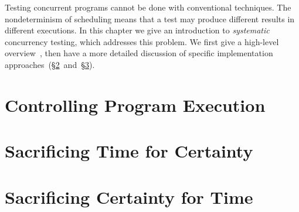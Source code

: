 \chapstart Testing concurrent programs cannot be done with conventional
techniques.  The nondeterminism of scheduling means that a test may produce
different results in different executions.  In this chapter we give an
introduction to \emph{systematic} concurrency testing, which addresses this
problem.  We first give a high-level overview~, then have
a more detailed discussion of specific implementation
approaches~(\S\ref{sec:sct-complete}~and~\S\ref{sec:sct-incomplete}).

\section{Controlling Program Execution}
\label{sec:sct-fundamentals}
\blindtext

\section{Sacrificing Time for Certainty}
\label{sec:sct-complete}
\blindtext

\section{Sacrificing Certainty for Time}
\label{sec:sct-incomplete}
\blindtext
